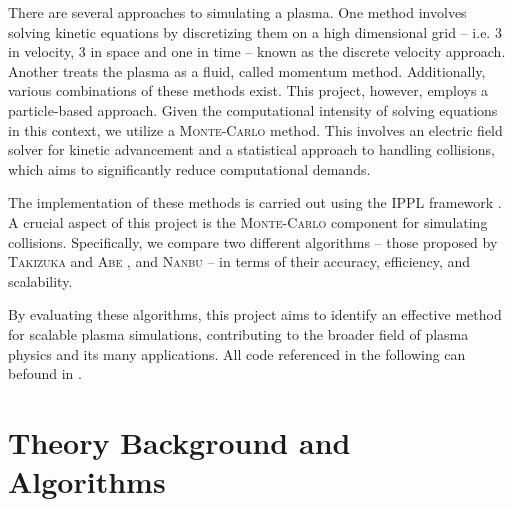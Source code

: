 There are several approaches to simulating a plasma. One method involves solving kinetic equations by discretizing them on a high dimensional grid -- i.e. 3 in velocity, 3 in space and one in time -- known as the discrete velocity approach. Another treats the plasma as a fluid, called momentum method. Additionally, various combinations of these methods exist. This project, however, employs a particle-based approach. Given the computational intensity of solving equations in this context, we utilize a \textsc{Monte-Carlo} method. This involves an electric field solver for kinetic advancement and a statistical approach to handling collisions, which aims to significantly reduce computational demands.

The implementation of these methods is carried out using the IPPL framework \cite{muralikrishnan2024scaling}. A crucial aspect of this project is the \textsc{Monte-Carlo} component for simulating collisions. Specifically, we compare two different algorithms -- those proposed by \textsc{Takizuka} and \textsc{Abe} \cite{TakizukaAbe1977}, and \textsc{Nanbu} \cite{Nanbu1997} -- in terms of their accuracy, efficiency, and scalability.

By evaluating these algorithms, this project aims to identify an effective method for scalable plasma simulations, contributing to the broader field of plasma physics and its many applications. All code referenced in the following can befound in \cite{aliemen2024}.


\section{Theory Background and Algorithms}




